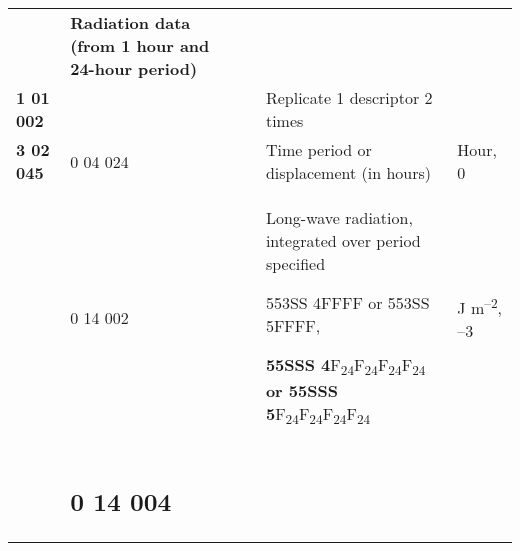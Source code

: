 \begin{longtable}[]{@{}lllll@{}}
\begin{minipage}[t]{0.17\columnwidth}
{\subsection{}\label{section-6}}\strut
\end{minipage} & \begin{minipage}[t]{0.17\columnwidth}\raggedright
\textbf{Radiation data (from 1 hour and 24-hour period)}\strut
\end{minipage} & \begin{minipage}[t]{0.17\columnwidth}\raggedright
\strut
\end{minipage}\tabularnewline
\textbf{1 01 002} & & & Replicate 1 descriptor 2 times &\tabularnewline
\textbf{3 02 045} & 0 04 024 & & Time period or displacement (in hours) & Hour, 0\tabularnewline
\begin{minipage}[t]{0.17\columnwidth}\raggedright
\strut
\end{minipage} & \begin{minipage}[t]{0.17\columnwidth}\raggedright
0 14 002\strut
\end{minipage} & \begin{minipage}[t]{0.17\columnwidth}\raggedright
\strut
\end{minipage} & \begin{minipage}[t]{0.17\columnwidth}\raggedright
Long-wave radiation, integrated over period specified

553SS 4FFFF or 553SS 5FFFF,

\textbf{55SSS 4}F\textsubscript{24}F\textsubscript{24}F\textsubscript{24}F\textsubscript{24} \textbf{or 55SSS 5}F\textsubscript{24}F\textsubscript{24}F\textsubscript{24}F\textsubscript{24}\strut
\end{minipage} & \begin{minipage}[t]{0.17\columnwidth}\raggedright
J m\textsuperscript{--2}, --3\strut
\end{minipage}\tabularnewline
\begin{minipage}[t]{0.17\columnwidth}\raggedright
\strut
\end{minipage} & \begin{minipage}[t]{0.17\columnwidth}\raggedright
\hypertarget{section-7}{%
\subsection{0 14 004}\label{section-7}}\strut
\end{minipage} & \begin{minipage}[t]{0.17\columnwidth}\raggedright
\hypertarget{section-8}{%
}
\end{minipage}
\end{longtable}
